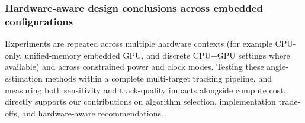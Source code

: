 \subsubsection{Hardware-aware design conclusions across embedded configurations}
Experiments are repeated across multiple hardware contexts (for example CPU-only, unified-memory embedded GPU, and discrete CPU+GPU settings where available) and across constrained power and clock modes. Testing these angle-estimation methods within a complete multi-target tracking pipeline, and measuring both sensitivity and track-quality impacts alongside compute cost, directly supports our contributions on algorithm selection, implementation trade-offs, and hardware-aware recommendations.
